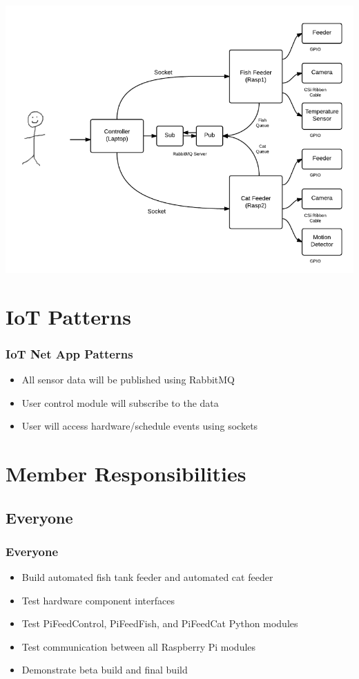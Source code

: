 \documentclass[]{beamer}
\begin{document}
\begin{frame}
    \includegraphics[width=\textwidth]{UseCase}
\end{frame}


\section{IoT Patterns}
\begin{frame}
	\frametitle{IoT Net App Patterns}
	\begin{itemize}
    \item All sensor data will be published using RabbitMQ
    \item User control module will subscribe to the data
    \item User will access hardware/schedule events using sockets
    \end{itemize}
\end{frame}




\section{Member Responsibilities}
\subsection{Everyone}
\begin{frame}
	\frametitle{Everyone}
	\begin{itemize}
    	\item Build automated fish tank feeder and automated cat feeder
        \item Test hardware component interfaces
        \item Test PiFeedControl, PiFeedFish, and PiFeedCat Python modules
        \item Test communication between all Raspberry Pi modules
        \item Demonstrate beta build and final build
    \end{itemize}
\end{frame}
\end{document}
